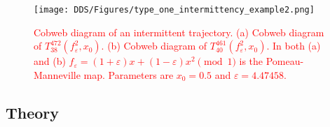\begin{figure}[!h]
    \centering
    \texttt{[image: DDS/Figures/type\_one\_intermittency\_example2.png]}
    \caption{
        \textcolor{red}{
        Cobweb diagram of an intermittent trajectory. 
        (a) Cobweb diagram of $T^{472}_{38}(f_{\varepsilon}^{2}, x_0)$. 
        (b) Cobweb diagram of $T^{461}_{40}(f_{\varepsilon}^{2}, x_0)$. 
        In both (a) and (b) $f_{\varepsilon} = (1+\varepsilon)x+(1-\varepsilon)x^2 \pmod{1}$ is the Pomeau-Manneville map. 
        Parameters are $x_0 = 0.5$ and $\varepsilon = 4.47458$.
        }
    }
    \label{fig:intermittent_cobweb_example}
\end{figure}

\subsection{Theory}

